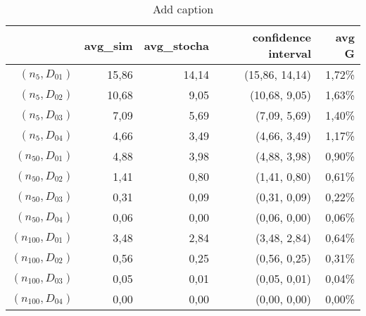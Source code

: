 \documentclass[preprint,12pt]{elsarticle}
\begin{document}
\begin{table}[htbp]
  \centering
  \caption{Add caption}
    \begin{tabular}{rrrrr}
    \toprule
          & avg\_sim & avg\_stocha & confidence interval & avg G \\
    \midrule
    $(n_{5},D_{01})$ & 15,86 & 14,14 & (15,86, 14,14) & 1,72\% \\
    $(n_{5},D_{02})$ & 10,68 & 9,05  & (10,68, 9,05) & 1,63\% \\
    $(n_{5},D_{03})$ & 7,09  & 5,69  & (7,09, 5,69) & 1,40\% \\
    $(n_{5},D_{04})$ & 4,66  & 3,49  & (4,66, 3,49) & 1,17\% \\
    $(n_{50},D_{01})$ & 4,88  & 3,98  & (4,88, 3,98) & 0,90\% \\
    $(n_{50},D_{02})$ & 1,41  & 0,80  & (1,41, 0,80) & 0,61\% \\
    $(n_{50},D_{03})$ & 0,31  & 0,09  & (0,31, 0,09) & 0,22\% \\
    $(n_{50},D_{04})$ & 0,06  & 0,00  & (0,06, 0,00) & 0,06\% \\
     $(n_{100},D_{01})$  & 3,48  & 2,84  & (3,48, 2,84) & 0,64\% \\
    $(n_{100},D_{02})$ & 0,56  & 0,25  & (0,56, 0,25) & 0,31\% \\
    $(n_{100},D_{03})$ & 0,05  & 0,01  & (0,05, 0,01) & 0,04\% \\
    $(n_{100},D_{04})$ & 0,00  & 0,00  & (0,00, 0,00) & 0,00\% \\
    \bottomrule
    \end{tabular}%
  \label{tab:addlabel}%
\end{table}%
\end{document}
